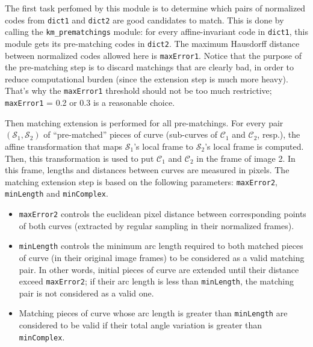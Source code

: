 The first task perfomed by this module is to determine which pairs of
normalized codes from \verb+dict1+ and \verb+dict2+ are good
candidates to match. This is done by calling the
\verb?km_prematchings? module: for every 
affine-invariant 
code in \verb+dict1+, this module gets its pre-matching codes in
\verb+dict2+. The maximum Hausdorff distance between normalized codes
allowed here is \verb+maxError1+. Notice that the purpose of the
pre-matching step is to discard matchings that are clearly bad, in
order to reduce computational burden (since the extension step is much
more heavy). That's why the \verb+maxError1+ threshold should not be
too much restrictive; \verb+maxError1+ = 0.2 or 0.3 is a reasonable
choice.

Then matching extension is performed for all pre-matchings. For every
pair $({\mathcal S}_1,{\mathcal S}_2)$ of ``pre-matched'' pieces of
curve (sub-curves of ${\mathcal C}_1$ and ${\mathcal C}_2$, resp.),
the affine transformation that maps ${\mathcal S}_1$'s local frame to
${\mathcal S}_2$'s local frame is computed. Then, this transformation
is used to put ${\mathcal C}_1$ and ${\mathcal C}_2$ in the frame of
image 2. In this frame, lengths and distances between curves are
measured in pixels. The matching extension step is based on the
following parameters: \verb+maxError2+, \verb+minLength+ and
\verb+minComplex+.

\begin{itemize}
  
\item \verb+maxError2+ controls the euclidean pixel distance between
  corresponding points of both curves (extracted by regular sampling
  in their normalized frames). 
  
\item \verb+minLength+ controls the minimum arc length required to
  both matched pieces of curve (in their original image frames) to be
  considered as a valid matching pair. In other words, initial pieces of
  curve are extended until their distance exceed \verb+maxError2+; if
  their arc length is less than \verb+minLength+, the matching pair is not
  considered as a valid one.
  
\item Matching pieces of curve whose arc length is greater than
  \verb+minLength+ are considered to be valid if their total angle
  variation is greater than \verb+minComplex+.

\end{itemize}

